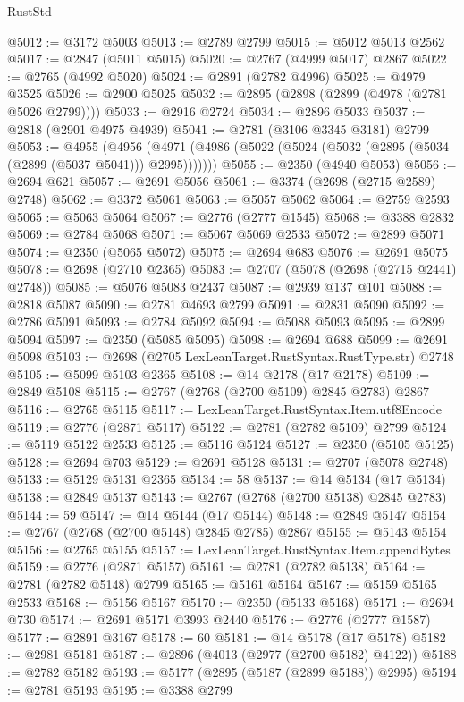 \begin{lexlean}{RustStd}
\begin{coremodule}
@5012 := @3172 @5003
@5013 := @2789 @2799
@5015 := @5012 @5013 @2562
@5017 := @2847 (@5011 @5015)
@5020 := @2767 (@4999 @5017) @2867
@5022 := @2765 (@4992 @5020)
@5024 := @2891 (@2782 @4996)
@5025 := @4979 @3525
@5026 := @2900 @5025
@5032 := @2895 (@2898 (@2899 (@4978 (@2781 @5026 @2799))))
@5033 := @2916 @2724
@5034 := @2896 @5033
@5037 := @2818 (@2901 @4975 @4939)
@5041 := @2781 (@3106 @3345 @3181) @2799
@5053 := @4955
    (@4956 (@4971 (@4986 (@5022 (@5024 (@5032 (@2895 (@5034 (@2899 (@5037 @5041))) @2995)))))))
@5055 := @2350 (@4940 @5053)
@5056 := @2694 @621
@5057 := @2691 @5056
@5061 := @3374 (@2698 (@2715 @2589) @2748)
@5062 := @3372 @5061
@5063 := @5057 @5062
@5064 := @2759 @2593
@5065 := @5063 @5064
@5067 := @2776 (@2777 @1545)
@5068 := @3388 @2832
@5069 := @2784 @5068
@5071 := @5067 @5069 @2533
@5072 := @2899 @5071
@5074 := @2350 (@5065 @5072)
@5075 := @2694 @683
@5076 := @2691 @5075
@5078 := @2698 (@2710 @2365)
@5083 := @2707 (@5078 (@2698 (@2715 @2441) @2748))
@5085 := @5076 @5083 @2437
@5087 := @2939 @137 @101
@5088 := @2818 @5087
@5090 := @2781 @4693 @2799
@5091 := @2831 @5090
@5092 := @2786 @5091
@5093 := @2784 @5092
@5094 := @5088 @5093
@5095 := @2899 @5094
@5097 := @2350 (@5085 @5095)
@5098 := @2694 @688
@5099 := @2691 @5098
@5103 := @2698 (@2705 LexLeanTarget.RustSyntax.RustType.str) @2748
@5105 := @5099 @5103 @2365
@5108 := @14 @2178 (@17 @2178)
@5109 := @2849 @5108
@5115 := @2767 (@2768 (@2700 @5109) @2845 @2783) @2867
@5116 := @2765 @5115
@5117 := LexLeanTarget.RustSyntax.Item.utf8Encode
@5119 := @2776 (@2871 @5117)
@5122 := @2781 (@2782 @5109) @2799
@5124 := @5119 @5122 @2533
@5125 := @5116 @5124
@5127 := @2350 (@5105 @5125)
@5128 := @2694 @703
@5129 := @2691 @5128
@5131 := @2707 (@5078 @2748)
@5133 := @5129 @5131 @2365
@5134 := 58
@5137 := @14 @5134 (@17 @5134)
@5138 := @2849 @5137
@5143 := @2767 (@2768 (@2700 @5138) @2845 @2783)
@5144 := 59
@5147 := @14 @5144 (@17 @5144)
@5148 := @2849 @5147
@5154 := @2767 (@2768 (@2700 @5148) @2845 @2785) @2867
@5155 := @5143 @5154
@5156 := @2765 @5155
@5157 := LexLeanTarget.RustSyntax.Item.appendBytes
@5159 := @2776 (@2871 @5157)
@5161 := @2781 (@2782 @5138)
@5164 := @2781 (@2782 @5148) @2799
@5165 := @5161 @5164
@5167 := @5159 @5165 @2533
@5168 := @5156 @5167
@5170 := @2350 (@5133 @5168)
@5171 := @2694 @730
@5174 := @2691 @5171 @3993 @2440
@5176 := @2776 (@2777 @1587)
@5177 := @2891 @3167
@5178 := 60
@5181 := @14 @5178 (@17 @5178)
@5182 := @2981 @5181
@5187 := @2896 (@4013 (@2977 (@2700 @5182) @4122))
@5188 := @2782 @5182
@5193 := @5177 (@2895 (@5187 (@2899 @5188)) @2995)
@5194 := @2781 @5193
@5195 := @3388 @2799

\end{coremodule}
\end{lexlean}
